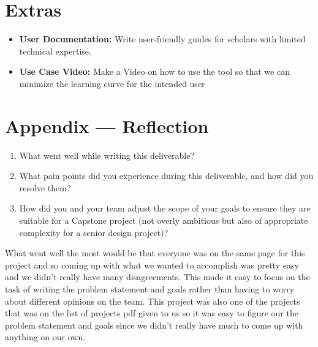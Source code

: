 \documentclass{article}
\begin{document}
\section{Extras}
\begin{itemize}
  \item \textbf{User Documentation:} Write user-friendly guides for scholars with limited technical expertise.
  \item \textbf{Use Case Video:} Make a Video on how to use the tool so that we can minimize the learning curve for the intended user
\end{itemize}


\newpage{}

\section*{Appendix --- Reflection}




\begin{enumerate}
    \item What went well while writing this deliverable? 
    \item What pain points did you experience during this deliverable, and how
    did you resolve them?
    \item How did you and your team adjust the scope of your goals to ensure
    they are suitable for a Capstone project (not overly ambitious but also of
    appropriate complexity for a senior design project)?
\end{enumerate}  



\hspace{2em} What went well the most would be that everyone was on the same page for this project and so coming up with what we wanted to accomplish was pretty easy and we didn't really have many disagreements. This made it easy to focus on the task of writing the problem statement and goals rather than having to worry about different opinions on the team. This project was also one of the projects that was on the list of projects pdf given to us so it was easy to figure our the problem statement and goals since we didn't really have much to come up with anything on our own. 
\end{document}
